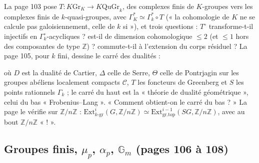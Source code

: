 \documentclass[11pt,a4paper]{article}
\begin{document}
La page 103 pose $T : K\mathrm{Gr}_K \to K\mathrm{QuGr}_k$, des complexes finis
de $K$-groupes vers les complexes finis de $k$-quasi-groupes, avec
$\Gamma^{*}_K \simeq \Gamma^{*}_k \circ T$ (« la cohomologie de $K$ ne se
calcule pas galoisiennement, celle de $k$ si »), et trois questions : $T^{\circ}$
transforme-t-il injectifs en $\Gamma^{\circ}_k$-acycliques ? est-il de dimension
cohomologique $\leq 2$ (et $\leq 1$ hors des composantes de type $\mathbb{Z}$) ?
commute-t-il à l'extension du corps résiduel ? La page 105, pour $k$ fini, dessine
le carré des dualités :


où $D$ est la dualité de Cartier, $\Delta$ celle de Serre, $\Theta$ celle de
Pontrjagin sur les groupes abéliens localement compacts $\mathcal{C}$, $T$ les
foncteurs de Greenberg et $S$ les points rationnels $\Gamma_k$ ; le carré du haut
est la « théorie de dualité géométrique », celui du bas « Frobenius–Lang ».
« Comment obtient-on le carré du bas ? » La page le vérifie sur
$\mathbb{Z}/n\mathbb{Z}$ : $\mathrm{Ext}^i_{k\text{-gr}}(G, \mathbb{Z}/n\mathbb{Z})
\simeq \mathrm{Ext}^{i-1}_{\mathrm{gr.top}}(SG, \mathbb{Z}/n\mathbb{Z})$, avec au
bout $\mathbb{Z}/n\mathbb{Z}$ « ! ».

\subsection*{Groupes finis, $\mu_p$, $\alpha_p$, $\mathbb{G}_m$ (pages 106 à 108)}
\end{document}
